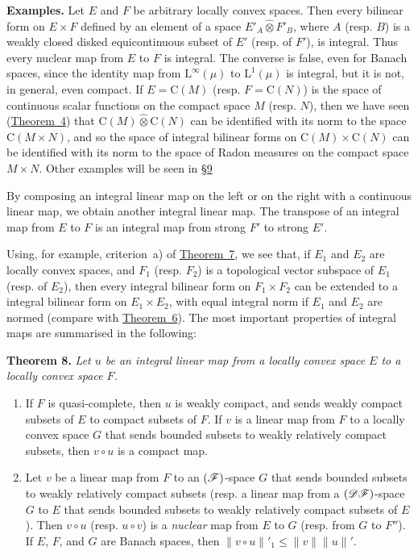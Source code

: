 \documentclass{article}
\theoremstyle{plain}
\newenvironment{itenv}[1]
  {\phantomsection\par\medskip\noindent\textbf{#1.}\itshape}
  {\medskip}
\newenvironment{rmenv}[1]
  {\phantomsection\par\medskip\noindent\textbf{#1.}\rmfamily}
  {\medskip}
\newcommand{\LL}{\mathrm{L}}
\newcommand{\CC}{\mathrm{C}}
\newcommand{\DF}{\mbox{\normalfont($\mathscr{DF}$)}}
\newcommand{\FF}{\mbox{\normalfont($\mathscr{F}$)}}
\newcommand{\hotimes}{\widehat{\otimes}}
\newcommand{\oldpage}[1]{\marginpar{\footnotesize$\Big\vert$ \textit{p.~#1}}}
\begin{document}
\begin{rmenv}{Examples}
  Let $E$ and $F$ be arbitrary locally convex spaces.
  Then every bilinear form on $E\times F$ defined by an element of a space $E'_A\hotimes F'_B$, where $A$ (resp. $B$) is a weakly closed disked equicontinuous subset of $E'$ (resp. of $F'$), is integral.
  Thus every nuclear map from $E$ to $F$ is integral.
  The
\oldpage{89}
  converse is false, even for Banach spaces, since the identity map from $\LL^\infty(\mu)$ to $\LL^1(\mu)$ is integral, but it is not, in general, even compact.
  If $E=\CC(M)$ (resp. $F=\CC(N)$) is the space of continuous scalar functions on the compact space $M$ (resp. $N$), then we have seen (\hyperref[1.theorem4]{Theorem~4}) that $\CC(M)\hotimes\CC(N)$ can be identified with its norm to the space $\CC(M\times N)$, and so the space of integral bilinear forms on $\CC(M)\times\CC(N)$ can be identified with its norm to the space of Radon measures on the compact space $M\times N$.
  Other examples will be seen in \hyperref[1.9]{\S9}

  By composing an integral linear map on the left or on the right with a continuous linear map, we obtain another integral linear map.
  The transpose of an integral map from $E$ to $F$ is an integral map from strong $F'$ to strong $E'$.

  Using, for example, criterion~a) of \hyperref[1.theorem7]{Theorem~7}, we see that, if $E_1$ and $E_2$ are locally convex spaces, and $F_1$ (resp. $F_2$) is a topological vector subspace of $E_1$ (resp. of $E_2$), then every integral bilinear form on $F_1\times F_2$ can be extended to a integral bilinear form on $E_1\times E_2$, with equal integral norm if $E_1$ and $E_2$ are normed (compare with \hyperref[1.theorem6]{Theorem~6}).
  The most important properties of integral maps are summarised in the following:
\end{rmenv}

\begin{itenv}{Theorem 8}
\label{1.theorem8}
  Let $u$ be an integral linear map from a locally convex space $E$ to a locally convex space $F$.
  \begin{enumerate}
    \item If $F$ is quasi-complete, then $u$ is weakly compact, and sends weakly compact subsets of $E$ to compact subsets of $F$.
      If $v$ is a linear map from $F$ to a locally convex space $G$ that sends bounded subsets to weakly relatively compact subsets, then $v\circ u$ is a compact map.
    \item Let $v$ be a linear map from $F$ to an $\FF$-space $G$ that sends bounded subsets to weakly relatively compact subsets (resp. a linear map from a $\DF$-space $G$ to $E$ that sends bounded subsets to weakly relatively compact subsets of $E$).
      Then $v\circ u$ (resp. $u\circ v$) is a \emph{nuclear} map from $E$ to $G$ (resp. from $G$ to $F''$).
      If $E$, $F$, and $G$ are Banach spaces, then $\|v\circ u\|'_1\leq\|v\|\|u\|'$.
  \end{enumerate}
\end{itenv}
\end{document}
